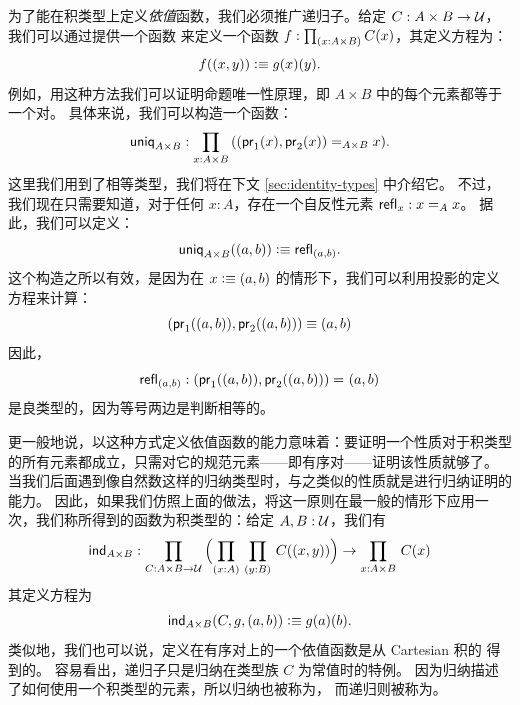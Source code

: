 为了能在积类型上定义\emph{依值}函数，我们必须推广递归子。给定 $C: A \times B \to \UU$，我们可以通过提供一个函数
来定义一个函数 $f : \prd{x : A \times B} C(x)$，其定义方程为：
\[ f(\tup x y) \defeq g(x)(y). \]
例如，用这种方法我们可以证明命题唯一性原理，即 $A\times B$ 中的每个元素都等于一个对。
%
具体来说，我们可以构造一个函数：
\[ \uniq{A\times B} : \prd{x:A \times B} (\id[A\times B]{\tup{\fst {(x)}}{\snd {(x)}}}{x}). \]
这里我们用到了相等类型，我们将在下文 \cref{sec:identity-types} 中介绍它。
不过，我们现在只需要知道，对于任何 $x:A$，存在一个自反性元素 $\refl{x} : \id[A]{x}{x}$。
据此，我们可以定义：
\label{uniquenessproduct}
\[ \uniq{A\times B}(\tup{a}{b}) \defeq \refl{\tup{a}{b}}. \]
这个构造之所以有效，是因为在 $x \defeq \tup{a}{b}$ 的情形下，我们可以利用投影的定义方程来计算：
\[ \tup{\fst(\tup{a}{b})}{\snd{(\tup{a}{b})}} \jdeq \tup{a}{b} \]
因此，
\[ \refl{\tup{a}{b}} : \id{\tup{\fst(\tup{a}{b})}{\snd{(\tup{a}{b})}}}{\tup{a}{b}} \]
是良类型的，因为等号两边是判断相等的。

更一般地说，以这种方式定义依值函数的能力意味着：要证明一个性质对于积类型的所有元素都成立，只需对它的规范元素——即有序对——证明该性质就够了。
当我们后面遇到像自然数这样的归纳类型时，与之类似的性质就是进行归纳证明的能力。
因此，如果我们仿照上面的做法，将这一原则在最一般的情形下应用一次，我们称所得到的函数为积类型的：给定 $A,B : \UU$，我们有
%
\[ \ind{A\times B} : \prd{C:A \times B \to \UU}
\Parens{\prd{x:A}{y:B} C(\tup{x}{y})} \to \prd{x:A \times B} C(x) \]
其定义方程为
\[ \ind{A\times B}(C,g,\tup{a}{b}) \defeq g(a)(b). \]
类似地，我们也可以说，定义在有序对上的一个依值函数是从 Cartesian 积的
%
%
得到的。
容易看出，递归子只是归纳在类型族 $C$ 为常值时的特例。
因为归纳描述了如何使用一个积类型的元素，所以归纳也被称为，
%
而递归则被称为。
%
%
%


